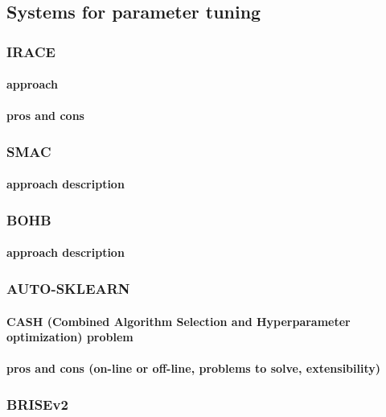 \subsection{Systems for parameter tuning}

\subsubsection{IRACE}
\paragraph{approach} \cite{irace:lopez2016irace}
\paragraph{pros and cons}

\subsubsection{SMAC}
\paragraph{approach description}

\subsubsection{BOHB}
\paragraph{approach description}

\subsubsection{AUTO-SKLEARN}
\paragraph{CASH (Combined Algorithm Selection and Hyperparameter optimization) problem}
\paragraph{pros and cons (on-line or off-line, problems to solve, extensibility)}\cite{autosklearn:feurer2015efficient}

\subsubsection{BRISEv2}
